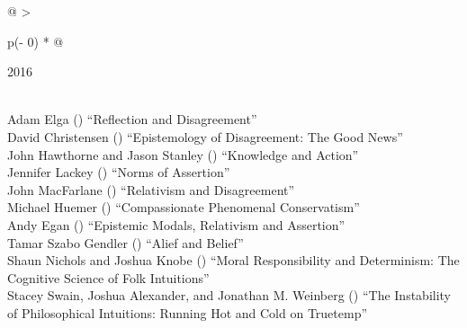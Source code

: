 \documentclass[
  10pt,
  letterpaper,
  DIV=11,
  numbers=noendperiod,
  twoside]{scrartcl}
\begin{document}
\begin{longtable}[]{@{}
  >{\raggedright\arraybackslash}p{(\columnwidth - 0\tabcolsep) * }@{}}

\caption{\label{tbl-top-ten-2007}Most cited articles published less than
ten years ago as of 2016.}

\tabularnewline

\toprule\noalign{}
\begin{minipage}[b]{\linewidth}\raggedright
2016
\end{minipage} \\
\midrule\noalign{}
\endhead
\bottomrule\noalign{}
\endlastfoot
Adam Elga
()
``Reflection and Disagreement'' \\
David Christensen
()
``Epistemology of Disagreement: The Good News'' \\
John Hawthorne and Jason Stanley
()
``Knowledge and Action'' \\
Jennifer Lackey
()
``Norms of Assertion'' \\
John MacFarlane
()
``Relativism and Disagreement'' \\
Michael Huemer
()
``Compassionate Phenomenal Conservatism'' \\
Andy Egan
()
``Epistemic Modals, Relativism and Assertion'' \\
Tamar Szabo Gendler
()
``Alief and Belief'' \\
Shaun Nichols and Joshua Knobe
()
``Moral Responsibility and Determinism: The Cognitive Science of Folk
Intuitions'' \\
Stacey Swain, Joshua Alexander, and Jonathan M. Weinberg
()
``The Instability of Philosophical Intuitions: Running Hot and Cold on
Truetemp'' \\

\end{longtable}
\end{document}
